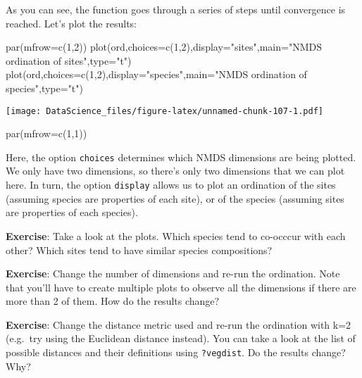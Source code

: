 \documentclass[
]{book}
\newenvironment{Shaded}{\begin{snugshade}}{\end{snugshade}}
\newcommand{\AttributeTok}[1]{\textcolor[rgb]{0.77,0.63,0.00}{#1}}
\newcommand{\DecValTok}[1]{\textcolor[rgb]{0.00,0.00,0.81}{#1}}
\newcommand{\FunctionTok}[1]{\textcolor[rgb]{0.00,0.00,0.00}{#1}}
\newcommand{\NormalTok}[1]{#1}
\newcommand{\StringTok}[1]{\textcolor[rgb]{0.31,0.60,0.02}{#1}}
\begin{document}
As you can see, the function goes through a series of steps until convergence is reached. Let's plot the results:

\begin{Shaded}
\begin{Highlighting}[]
\FunctionTok{par}\NormalTok{(}\AttributeTok{mfrow=}\FunctionTok{c}\NormalTok{(}\DecValTok{1}\NormalTok{,}\DecValTok{2}\NormalTok{))}
\FunctionTok{plot}\NormalTok{(ord,}\AttributeTok{choices=}\FunctionTok{c}\NormalTok{(}\DecValTok{1}\NormalTok{,}\DecValTok{2}\NormalTok{),}\AttributeTok{display=}\StringTok{"sites"}\NormalTok{,}\AttributeTok{main=}\StringTok{"NMDS ordination of sites"}\NormalTok{,}\AttributeTok{type=}\StringTok{"t"}\NormalTok{)}
\FunctionTok{plot}\NormalTok{(ord,}\AttributeTok{choices=}\FunctionTok{c}\NormalTok{(}\DecValTok{1}\NormalTok{,}\DecValTok{2}\NormalTok{),}\AttributeTok{display=}\StringTok{"species"}\NormalTok{,}\AttributeTok{main=}\StringTok{"NMDS ordination of species"}\NormalTok{,}\AttributeTok{type=}\StringTok{"t"}\NormalTok{)}
\end{Highlighting}
\end{Shaded}

\texttt{[image: DataScience\_files/figure-latex/unnamed-chunk-107-1.pdf]}

\begin{Shaded}
\begin{Highlighting}[]
\FunctionTok{par}\NormalTok{(}\AttributeTok{mfrow=}\FunctionTok{c}\NormalTok{(}\DecValTok{1}\NormalTok{,}\DecValTok{1}\NormalTok{))}
\end{Highlighting}
\end{Shaded}

Here, the option \texttt{choices} determines which NMDS dimensions are being plotted. We only have two dimensions, so there's only two dimensions that we can plot here. In turn, the option \texttt{display} allows us to plot an ordination of the sites (assuming species are properties of each site), or of the species (assuming sites are properties of each species).

\textbf{Exercise}: Take a look at the plots. Which species tend to co-occcur with each other? Which sites tend to have similar species compositions?

\textbf{Exercise}: Change the number of dimensions and re-run the ordination. Note that you'll have to create multiple plots to observe all the dimensions if there are more than 2 of them. How do the results change?

\textbf{Exercise}: Change the distance metric used and re-run the ordination with k=2 (e.g.~try using the Euclidean distance instead). You can take a look at the list of possible distances and their definitions using \texttt{?vegdist}. Do the results change? Why?
\end{document}
